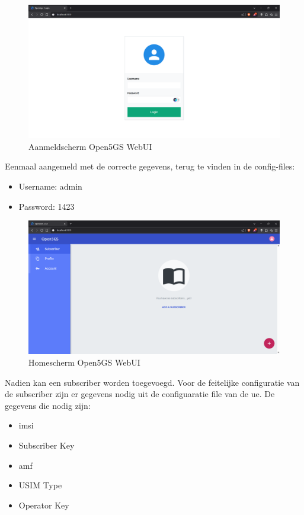 \begin{figure}[H]
    \includegraphics[width=\linewidth]{../graphics/POC-WebUI-Login.png}
    \caption{Aanmeldscherm Open5GS WebUI }
    \label{fig:Aanmeld WebUI}
\end{figure}

Eenmaal aangemeld met de correcte gegevens, terug te vinden in de config-files:

\begin{itemize}
    \item Username: admin
    \item Password: 1423
\end{itemize}

\begin{figure}[H]
    \includegraphics[width=\linewidth]{../graphics/POC-WebUI-home.png}
    \caption{Homescherm Open5GS WebUI }
    \label{fig:Home WebUI}
\end{figure}

Nadien kan een  subscriber worden toegevoegd.
Voor de feitelijke configuratie van de subscriber zijn er gegevens nodig uit de configuaratie file van de \gls{ue}. De gegevens die nodig zijn:

\begin{itemize}
    \item \gls{imsi}
    \item Subscriber Key
    \item \gls{amf}
    \item USIM Type
    \item Operator Key
\end{itemize}

